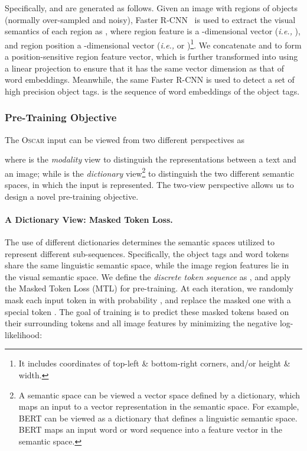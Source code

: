 \documentclass[runningheads]{llncs}
\newcommand{\ie}[0]{\emph{i.e., }}
\newcommand{\short}{\textsc{Oscar}}
\begin{document}
Specifically,  and  are generated as follows.
Given an image with  regions of objects (normally over-sampled and noisy), Faster R-CNN~\cite{ren2015faster} is used to extract the visual semantics of each region as , where region feature  is a -dimensional vector (\ie ), and region position  a -dimensional vector (\ie  or )\footnote{It includes coordinates of top-left \& bottom-right corners, and/or height \& width.}. We concatenate  and  to form a position-sensitive region feature vector, which is further transformed into  using a linear projection to ensure that it has the same vector dimension as that of word embeddings.
Meanwhile, the same Faster R-CNN is used to detect a set of high precision object tags. 
 is the sequence of word embeddings of the object tags.















\subsubsection{Pre-Training Objective}

The \short{} input can be viewed from two different perspectives as


where  is the {\it modality} view to distinguish the representations between a text and an image; while  is the {\it dictionary} view\footnote{A semantic space can be viewed a vector space defined by a dictionary, which maps an input to a vector representation in the semantic space. For example, BERT can be viewed as a dictionary that defines a linguistic semantic space. BERT maps an input word or word sequence into a feature vector in the semantic space.}
to distinguish the two different semantic spaces, in which the input is represented. The two-view perspective allows us to design a novel pre-training objective.

\paragraph{A Dictionary View: Masked Token Loss.} 
The use of different dictionaries determines the semantic spaces utilized to represent different sub-sequences. Specifically,
the object tags and word tokens share the same linguistic semantic space, while the image region features lie in the visual semantic space. 
We define the {\it discrete token sequence} as , and apply the Masked Token Loss (MTL) for pre-training. At each iteration, we randomly mask each input token in  with probability , and replace the masked one  with a special token . The goal of training is to predict these masked tokens based on their surrounding tokens  and all image features  by minimizing the negative log-likelihood:
\end{document}
